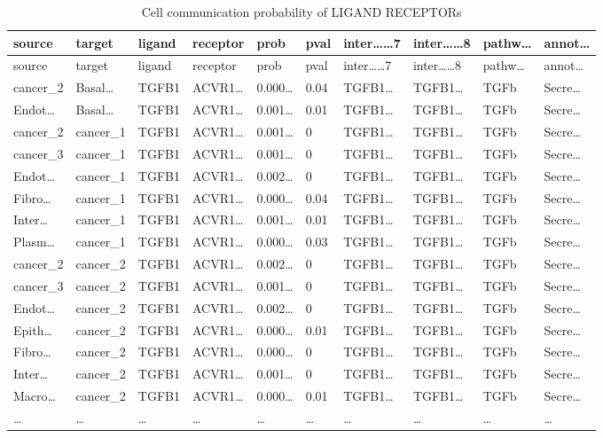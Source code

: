 \documentclass[
]{article}
\begin{document}
\begin{longtable}[]{@{}llllllllll@{}}
\caption{\label{tab:cell-communication-probability-of-LIGAND-RECEPTORs}Cell communication probability of LIGAND RECEPTORs}\tabularnewline
\toprule
source & target & ligand & receptor & prob & pval & inter\ldots\ldots7 & inter\ldots\ldots8 & pathw\ldots{} & annot\ldots{}\tabularnewline
\midrule
\endfirsthead
\toprule
source & target & ligand & receptor & prob & pval & inter\ldots\ldots7 & inter\ldots\ldots8 & pathw\ldots{} & annot\ldots{}\tabularnewline
\midrule
\endhead
cancer\_2 & Basal\ldots{} & TGFB1 & ACVR1\ldots{} & 0.000\ldots{} & 0.04 & TGFB1\ldots{} & TGFB1\ldots{} & TGFb & Secre\ldots{}\tabularnewline
Endot\ldots{} & Basal\ldots{} & TGFB1 & ACVR1\ldots{} & 0.001\ldots{} & 0.01 & TGFB1\ldots{} & TGFB1\ldots{} & TGFb & Secre\ldots{}\tabularnewline
cancer\_2 & cancer\_1 & TGFB1 & ACVR1\ldots{} & 0.001\ldots{} & 0 & TGFB1\ldots{} & TGFB1\ldots{} & TGFb & Secre\ldots{}\tabularnewline
cancer\_3 & cancer\_1 & TGFB1 & ACVR1\ldots{} & 0.001\ldots{} & 0 & TGFB1\ldots{} & TGFB1\ldots{} & TGFb & Secre\ldots{}\tabularnewline
Endot\ldots{} & cancer\_1 & TGFB1 & ACVR1\ldots{} & 0.002\ldots{} & 0 & TGFB1\ldots{} & TGFB1\ldots{} & TGFb & Secre\ldots{}\tabularnewline
Fibro\ldots{} & cancer\_1 & TGFB1 & ACVR1\ldots{} & 0.000\ldots{} & 0.04 & TGFB1\ldots{} & TGFB1\ldots{} & TGFb & Secre\ldots{}\tabularnewline
Inter\ldots{} & cancer\_1 & TGFB1 & ACVR1\ldots{} & 0.001\ldots{} & 0.01 & TGFB1\ldots{} & TGFB1\ldots{} & TGFb & Secre\ldots{}\tabularnewline
Plasm\ldots{} & cancer\_1 & TGFB1 & ACVR1\ldots{} & 0.000\ldots{} & 0.03 & TGFB1\ldots{} & TGFB1\ldots{} & TGFb & Secre\ldots{}\tabularnewline
cancer\_2 & cancer\_2 & TGFB1 & ACVR1\ldots{} & 0.002\ldots{} & 0 & TGFB1\ldots{} & TGFB1\ldots{} & TGFb & Secre\ldots{}\tabularnewline
cancer\_3 & cancer\_2 & TGFB1 & ACVR1\ldots{} & 0.001\ldots{} & 0 & TGFB1\ldots{} & TGFB1\ldots{} & TGFb & Secre\ldots{}\tabularnewline
Endot\ldots{} & cancer\_2 & TGFB1 & ACVR1\ldots{} & 0.002\ldots{} & 0 & TGFB1\ldots{} & TGFB1\ldots{} & TGFb & Secre\ldots{}\tabularnewline
Epith\ldots{} & cancer\_2 & TGFB1 & ACVR1\ldots{} & 0.000\ldots{} & 0.01 & TGFB1\ldots{} & TGFB1\ldots{} & TGFb & Secre\ldots{}\tabularnewline
Fibro\ldots{} & cancer\_2 & TGFB1 & ACVR1\ldots{} & 0.000\ldots{} & 0 & TGFB1\ldots{} & TGFB1\ldots{} & TGFb & Secre\ldots{}\tabularnewline
Inter\ldots{} & cancer\_2 & TGFB1 & ACVR1\ldots{} & 0.001\ldots{} & 0 & TGFB1\ldots{} & TGFB1\ldots{} & TGFb & Secre\ldots{}\tabularnewline
Macro\ldots{} & cancer\_2 & TGFB1 & ACVR1\ldots{} & 0.000\ldots{} & 0.01 & TGFB1\ldots{} & TGFB1\ldots{} & TGFb & Secre\ldots{}\tabularnewline
\ldots{} & \ldots{} & \ldots{} & \ldots{} & \ldots{} & \ldots{} & \ldots{} & \ldots{} & \ldots{} & \ldots{}\tabularnewline
\bottomrule
\end{longtable}
\end{document}
